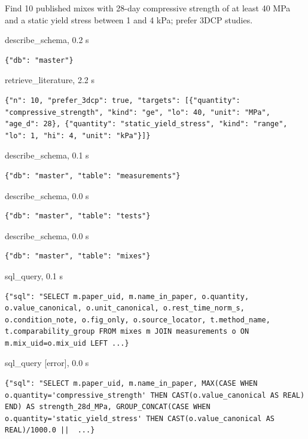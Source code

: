 \begin{userbox}
Find 10 published mixes with 28-day compressive strength of at least 40 MPa and a static yield stress between 1 and 4 kPa; prefer 3DCP studies.
\end{userbox}
\begin{toolbox}{describe\_schema, 0.2 s}
\begin{lstlisting}[style=argstyle]
{"db": "master"}
\end{lstlisting}
\end{toolbox}
\begin{toolbox}{retrieve\_literature, 2.2 s}
\begin{lstlisting}[style=argstyle]
{"n": 10, "prefer_3dcp": true, "targets": [{"quantity": "compressive_strength", "kind": "ge", "lo": 40, "unit": "MPa", "age_d": 28}, {"quantity": "static_yield_stress", "kind": "range", "lo": 1, "hi": 4, "unit": "kPa"}]}
\end{lstlisting}
\end{toolbox}
\begin{toolbox}{describe\_schema, 0.1 s}
\begin{lstlisting}[style=argstyle]
{"db": "master", "table": "measurements"}
\end{lstlisting}
\end{toolbox}
\begin{toolbox}{describe\_schema, 0.0 s}
\begin{lstlisting}[style=argstyle]
{"db": "master", "table": "tests"}
\end{lstlisting}
\end{toolbox}
\begin{toolbox}{describe\_schema, 0.0 s}
\begin{lstlisting}[style=argstyle]
{"db": "master", "table": "mixes"}
\end{lstlisting}
\end{toolbox}
\begin{toolbox}{sql\_query, 0.1 s}
\begin{lstlisting}[style=argstyle]
{"sql": "SELECT m.paper_uid, m.name_in_paper, o.quantity, o.value_canonical, o.unit_canonical, o.rest_time_norm_s, o.condition_note, o.fig_only, o.source_locator, t.method_name, t.comparability_group FROM mixes m JOIN measurements o ON m.mix_uid=o.mix_uid LEFT ...}
\end{lstlisting}
\end{toolbox}
\begin{toolbox}{sql\_query [error], 0.0 s}
\begin{lstlisting}[style=argstyle]
{"sql": "SELECT m.paper_uid, m.name_in_paper, MAX(CASE WHEN o.quantity='compressive_strength' THEN CAST(o.value_canonical AS REAL) END) AS strength_28d_MPa, GROUP_CONCAT(CASE WHEN o.quantity='static_yield_stress' THEN CAST(o.value_canonical AS REAL)/1000.0 ||  ...}
\end{lstlisting}
\end{toolbox}
